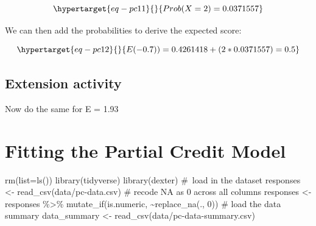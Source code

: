 \documentclass[
  letterpaper,
  DIV=11,
  numbers=noendperiod]{scrreprt}
\newenvironment{Shaded}{\begin{snugshade}}{\end{snugshade}}
\newcommand{\AttributeTok}[1]{\textcolor[rgb]{0.40,0.45,0.13}{#1}}
\newcommand{\CommentTok}[1]{\textcolor[rgb]{0.37,0.37,0.37}{#1}}
\newcommand{\DecValTok}[1]{\textcolor[rgb]{0.68,0.00,0.00}{#1}}
\newcommand{\FunctionTok}[1]{\textcolor[rgb]{0.28,0.35,0.67}{#1}}
\newcommand{\NormalTok}[1]{\textcolor[rgb]{0.00,0.23,0.31}{#1}}
\newcommand{\OtherTok}[1]{\textcolor[rgb]{0.00,0.23,0.31}{#1}}
\newcommand{\SpecialCharTok}[1]{\textcolor[rgb]{0.37,0.37,0.37}{#1}}
\newcommand{\StringTok}[1]{\textcolor[rgb]{0.13,0.47,0.30}{#1}}
\begin{document}
\begin{equation}\protect\hypertarget{eq-pc11}{}{
Prob(X=2) = 0.0371557
}\label{eq-pc11}\end{equation}

We can then add the probabilities to derive the expected score:

\begin{equation}\protect\hypertarget{eq-pc12}{}{
E (-0.7)) = 0.4261418 + (2 * 0.0371557) = 0.5
}\label{eq-pc12}\end{equation}

\hypertarget{extension-activity-1}{%
\section{Extension activity}\label{extension-activity-1}}

Now do the same for E = 1.93

\hypertarget{fitting-the-partial-credit-model}{%
\chapter{Fitting the Partial Credit
Model}\label{fitting-the-partial-credit-model}}

\begin{Shaded}
\begin{Highlighting}[]
\FunctionTok{rm}\NormalTok{(}\AttributeTok{list=}\FunctionTok{ls}\NormalTok{())}
\FunctionTok{library}\NormalTok{(tidyverse)}
\FunctionTok{library}\NormalTok{(dexter)}
\CommentTok{\# load in the dataset}
\NormalTok{responses }\OtherTok{\textless{}{-}} \FunctionTok{read\_csv}\NormalTok{(}\StringTok{\textquotesingle{}data/pc{-}data.csv\textquotesingle{}}\NormalTok{)}
\CommentTok{\# recode NA as 0 across all columns}
\NormalTok{responses }\OtherTok{\textless{}{-}}\NormalTok{ responses }\SpecialCharTok{\%\textgreater{}\%} 
  \FunctionTok{mutate\_if}\NormalTok{(is.numeric, }\SpecialCharTok{\textasciitilde{}}\FunctionTok{replace\_na}\NormalTok{(., }\DecValTok{0}\NormalTok{))}
\CommentTok{\# load the data summary}
\NormalTok{data\_summary }\OtherTok{\textless{}{-}} \FunctionTok{read\_csv}\NormalTok{(}\StringTok{\textquotesingle{}data/pc{-}data{-}summary.csv\textquotesingle{}}\NormalTok{)}
\end{Highlighting}
\end{Shaded}
\end{document}
